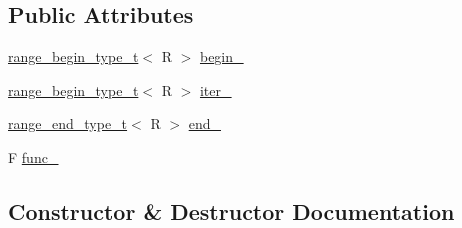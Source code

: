 \subsection*{Public Attributes}
\begin{DoxyCompactItemize}
\item 
\mbox{\hyperlink{namespace_r_a_h___n_a_m_e_s_p_a_c_e_a46705781d6869d5151141f871ced1e9c}{range\+\_\+begin\+\_\+type\+\_\+t}}$<$ R $>$ \mbox{\hyperlink{struct_r_a_h___n_a_m_e_s_p_a_c_e_1_1view_1_1filter__iterator_a8a953a6dfd5a7d536749ea0545ac7528}{begin\+\_\+}}
\item 
\mbox{\hyperlink{namespace_r_a_h___n_a_m_e_s_p_a_c_e_a46705781d6869d5151141f871ced1e9c}{range\+\_\+begin\+\_\+type\+\_\+t}}$<$ R $>$ \mbox{\hyperlink{struct_r_a_h___n_a_m_e_s_p_a_c_e_1_1view_1_1filter__iterator_ac5b8112fa111a784e28ced304df2f1d9}{iter\+\_\+}}
\item 
\mbox{\hyperlink{namespace_r_a_h___n_a_m_e_s_p_a_c_e_aadeb8c12d454f4cc70bf80766871d3b2}{range\+\_\+end\+\_\+type\+\_\+t}}$<$ R $>$ \mbox{\hyperlink{struct_r_a_h___n_a_m_e_s_p_a_c_e_1_1view_1_1filter__iterator_affa14e2b79bac2b7fa67a9b55094d9db}{end\+\_\+}}
\item 
F \mbox{\hyperlink{struct_r_a_h___n_a_m_e_s_p_a_c_e_1_1view_1_1filter__iterator_a817c551a4fc6335a1a1de29ad84e39aa}{func\+\_\+}}
\end{DoxyCompactItemize}


\subsection{Constructor \& Destructor Documentation}
\mbox{\label{struct_r_a_h___n_a_m_e_s_p_a_c_e_1_1view_1_1filter__iterator_ae4f5eb6b3eb823038ef8fa0d1806995a}} 
